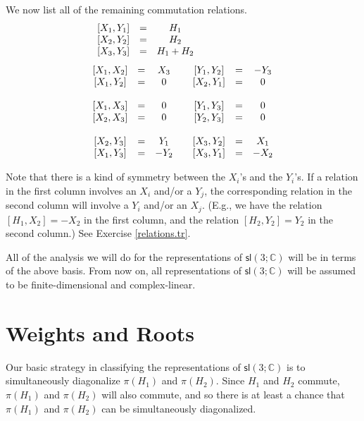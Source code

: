 \documentclass{amsbook}
\theoremstyle{plain}
\numberwithin{equation}{chapter}
\numberwithin{theorem}{chapter}
\begin{document}
We now list all of the remaining commutation relations.
\[%
\begin{array}
[c]{ccccccc}%
\left[  X_{1},Y_{1}\right]  & = & H_{1} &  &  &  & \\
\left[  X_{2},Y_{2}\right]  & = & H_{2} &  &  &  & \\
\left[  X_{3},Y_{3}\right]  & = & H_{1}+H_{2} &  & \qquad & \ \ \quad &
\end{array}
\]%
\[%
\begin{array}
[c]{ccccccc}%
\left[  X_{1},X_{2}\right]  & = & X_{3} &  & \left[  Y_{1},Y_{2}\right]  & = &
-Y_{3}\\
\left[  X_{1},Y_{2}\right]  & = & 0 &  & \left[  X_{2},Y_{1}\right]  & = & 0\\
&  &  &  &  &  & \\
\left[  X_{1},X_{3}\right]  & = & 0 &  & \left[  Y_{1},Y_{3}\right]  & = & 0\\
\left[  X_{2},X_{3}\right]  & = & 0 &  & \left[  Y_{2},Y_{3}\right]  & = & 0\\
&  &  &  &  &  & \\
\left[  X_{2},Y_{3}\right]  & = & Y_{1} &  & \left[  X_{3},Y_{2}\right]  & = &
X_{1}\\
\left[  X_{1},Y_{3}\right]  & = & -Y_{2} &  & \left[  X_{3},Y_{1}\right]  &
= & -X_{2}%
\end{array}
\]

Note that there is a kind of symmetry between the $X_{i}$'s and the $Y_{i}$'s.
If a relation in the first column involves an $X_{i}$ and/or a $Y_{j}$, the
corresponding relation in the second column will involve a $Y_{i}$ and/or an
$X_{j}$. (E.g., we have the relation $\left[  H_{1},X_{2}\right]  =-X_{2}$ in
the first column, and the relation $\left[  H_{2},Y_{2}\right]  =Y_{2}$ in the
second column.) See Exercise \ref{relations.tr}.

All of the analysis we will do for the representations of $\mathsf{sl}\left(
3;\mathbb{C}\right)  $ will be in terms of the above basis. From now on, all
representations of $\mathsf{sl}\left(  3;\mathbb{C}\right)  $ will be assumed
to be finite-dimensional and complex-linear.

\section{Weights and Roots}

Our basic strategy in classifying the representations of $\mathsf{sl}\left(
3;\mathbb{C}\right)  $ is to simultaneously diagonalize $\pi(H_{1})$ and
$\pi(H_{2})$. Since $H_{1}$ and $H_{2}$ commute, $\pi(H_{1})$ and $\pi(H_{2})$
will also commute, and so there is at least a chance that $\pi(H_{1})$ and
$\pi(H_{2})$ can be simultaneously diagonalized.
\end{document}
